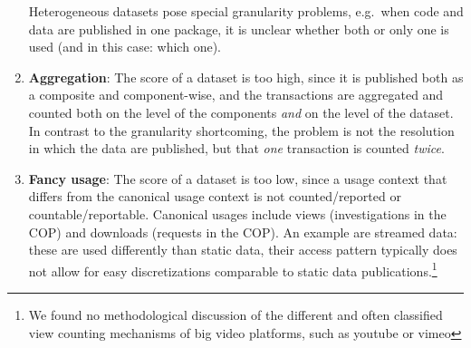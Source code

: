 \documentclass[conference, a4paper]{IEEEtran}\usepackage[]{graphicx}\usepackage[]{color}
\begin{document}
\begin{enumerate}
Heterogeneous datasets pose special granularity problems,
e.g.\ when code and data are published in one package,
it is unclear whether both or only one is used (and in this case: which one).
\item \textbf{Aggregation}: The score of a dataset is too high,
since it is published both as a composite and component-wise,
and the transactions are aggregated and counted both on the level of the components
\emph{and} on the level of the dataset.
In contrast to the granularity shortcoming, the problem is not the resolution
in which the data are published, but that \emph{one} transaction is counted \emph{twice}.
\item \textbf{Fancy usage}: The score of a dataset is too low,
since a usage context that differs from the canonical usage context
is not counted/reported or countable/reportable.
Canonical usages include views (investigations in the COP) and
downloads (requests in the COP).
An example are streamed data: these are used differently than static data,
their access pattern typically does not allow
for easy discretizations comparable to static data publications.\footnote{
We found no methodological discussion of the different and often classified
view counting mechanisms of big video platforms, such as youtube or vimeo}


\end{enumerate}
\end{document}
